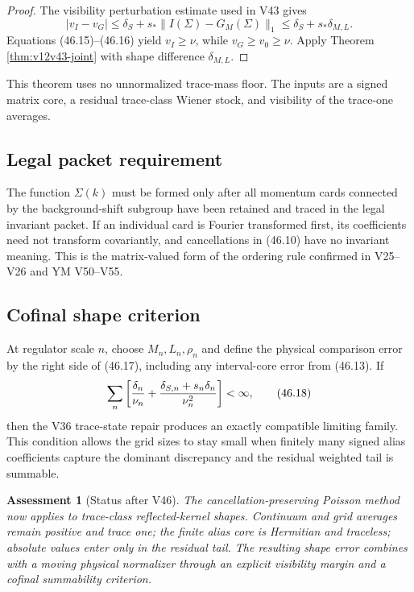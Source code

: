 \documentclass[11pt]{article}
\newtheorem{assessment}[theorem]{Assessment}
\theoremstyle{remark}
\begin{document}
\begin{proof}
The visibility perturbation estimate used in V43 gives
\[
 |v_I-v_G|
 \leq
 \delta_S+s_*\|I(\Sigma)-G_M(\Sigma)\|_1
 \leq
 \delta_S+s_*\delta_{M,L}.
\]
Equations (46.15)--(46.16) yield \(v_I\geq\nu\), while
\(v_G\geq v_0\geq\nu\).  Apply Theorem
\ref{thm:v12v43-joint} with shape difference
\(\delta_{M,L}\).
\end{proof}

This theorem uses no unnormalized trace-mass floor.  The inputs are
a signed matrix core, a residual trace-class Wiener stock, and
visibility of the trace-one averages.

\subsection{Legal packet requirement}

The function \(\Sigma(k)\) must be formed only after all momentum
cards connected by the background-shift subgroup have been retained
and traced in the legal invariant packet.  If an individual card is
Fourier transformed first, its coefficients need not transform
covariantly, and cancellations in (46.10) have no invariant meaning.
This is the matrix-valued form of the ordering rule confirmed in
V25--V26 and YM V50--V55.

\subsection{Cofinal shape criterion}

At regulator scale \(n\), choose \(M_n,L_n,\rho_n\) and define the
physical comparison error by the right side of (46.17), including
any interval-core error from (46.13).  If
\begin{equation}
 \sum_n
 \left[
 {\delta_{n}\over\nu_n}
 +
 {\delta_{S,n}+s_n\delta_n\over\nu_n^2}
 \right]
 <\infty,                                        \tag{46.18}
\end{equation}
then the V36 trace-state repair produces an exactly compatible
limiting family.  This condition allows the grid sizes to stay
small when finitely many signed alias coefficients capture the
dominant discrepancy and the residual weighted tail is summable.

\begin{assessment}[Status after V46]
\label{ass:v12v46-status}
The cancellation-preserving Poisson method now applies to
trace-class reflected-kernel shapes.  Continuum and grid averages
remain positive and trace one; the finite alias core is Hermitian
and traceless; absolute values enter only in the residual tail.
The resulting shape error combines with a moving physical
normalizer through an explicit visibility margin and a cofinal
summability criterion.
\end{assessment}
\end{document}
